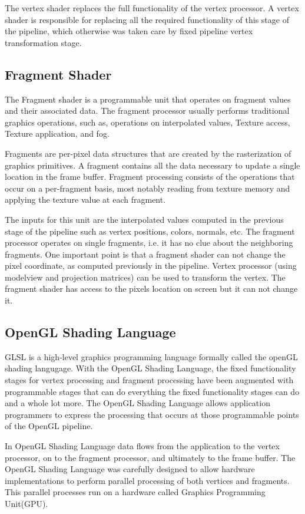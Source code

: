 The vertex shader replaces the full functionality of the vertex processor. A vertex shader is responsible for replacing all the required functionality of this stage of the pipeline, which otherwise was taken care by fixed pipeline vertex transformation stage.

\subsection{Fragment Shader}
The Fragment shader is a programmable unit that operates on fragment values and their associated data. The fragment processor usually performs traditional graphics operations, such as, operations on interpolated values, Texture access, Texture application, and fog.

Fragments are per-pixel data structures that are created by the rasterization of graphics primitives. A fragment contains all the data necessary to update a single location in the frame buffer. Fragment processing consists of the operations that occur on a per-fragment basis, most notably reading from texture memory and applying the texture value at each fragment.

The inputs for this unit are the interpolated values computed in the previous stage of the pipeline such as vertex positions, colors, normals, etc. The fragment processor operates on single fragments, i.e. it has no clue about the neighboring fragments. One important point is that a fragment shader can not change the pixel coordinate, as computed previously in the pipeline. Vertex processor (using modelview and projection matrices) can be used to transform the vertex. The fragment shader has access to the pixels location on screen but it can not change it.

\subsection{OpenGL Shading Language}

GLSL is a high-level graphics programming language formally called the openGL shading langugage. With the OpenGL Shading Language, the fixed functionality stages for vertex processing and fragment processing have been augmented with programmable stages that can do everything the fixed functionality stages can do and a whole lot more. The OpenGL Shading Language allows application programmers to express the processing that occurs at those programmable points of the OpenGL pipeline.

In OpenGL Shading Language data flows from the application to the vertex processor, on to the fragment processor, and ultimately to
the frame buffer. The OpenGL Shading Language was carefully designed to allow hardware implementations to perform parallel processing of both vertices and fragments. This parallel processes run on a hardware called Graphics Programming Unit(GPU).


